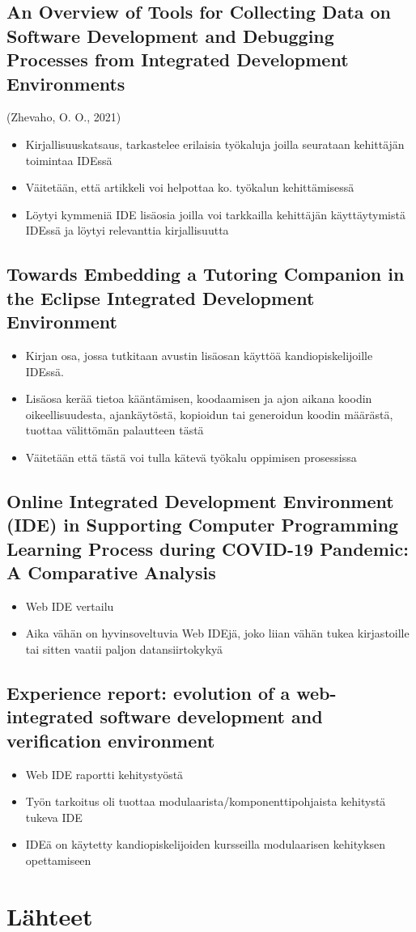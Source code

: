\documentclass[11pt]{article}
\begin{document}
\subsection{An Overview of Tools for Collecting Data on Software Development and Debugging Processes from Integrated Development Environments}
\label{sec:org1ba6867}
(Zhevaho, O. O., 2021)
\begin{itemize}
\item Kirjallisuuskatsaus, tarkastelee erilaisia työkaluja joilla
seurataan kehittäjän toimintaa IDEssä
\item Väitetään, että artikkeli voi helpottaa ko. työkalun kehittämisessä
\item Löytyi kymmeniä IDE lisäosia joilla voi tarkkailla kehittäjän
käyttäytymistä IDEssä ja löytyi relevanttia kirjallisuutta
\end{itemize}


\subsection{Towards Embedding a Tutoring Companion in the Eclipse Integrated Development Environment}
\begin{itemize}
\item Kirjan osa, jossa tutkitaan avustin lisäosan käyttöä kandiopiskelijoille IDEssä.
\item Lisäosa kerää tietoa kääntämisen, koodaamisen ja ajon aikana koodin oikeellisuudesta, ajankäytöstä, kopioidun tai generoidun koodin määrästä, tuottaa välittömän palautteen tästä
\item Väitetään että tästä voi tulla kätevä työkalu oppimisen prosessissa
\end{itemize}


\subsection{Online Integrated Development Environment (IDE) in Supporting Computer Programming Learning Process during COVID-19 Pandemic: A Comparative Analysis}
\begin{itemize}
\item Web IDE vertailu
\item Aika vähän on hyvinsoveltuvia Web IDEjä, joko liian vähän tukea
  kirjastoille tai sitten vaatii paljon datansiirtokykyä
\end{itemize}

\subsection{Experience report: evolution of a web-integrated software development and verification environment}
\begin{itemize}
\item Web IDE raportti kehitystyöstä
\item Työn tarkoitus oli tuottaa modulaarista/komponenttipohjaista
  kehitystä tukeva IDE
\item IDEä on käytetty kandiopiskelijoiden kursseilla modulaarisen
  kehityksen opettamiseen
\end{itemize}


\section{Lähteet}
\label{sec:orgb7e844c}
\end{document}
